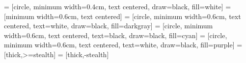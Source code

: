\usepackage{amsmath}
\usepackage{upgreek}

\usepackage{pgfpages}
\usepackage{csquotes}
\usepackage{placeins}
\usepackage[onehalfspacing]{setspace}
\usepackage{mathpartir}

\usepackage[labelformat=empty]{caption}

\usepackage{xcolor}

\RequirePackage{tikz}
\usetikzlibrary{calc}
\usetikzlibrary{arrows,shapes,positioning}

\usetikzlibrary{positioning}
 = [circle, minimum width=0.4cm, text centered, draw=black, fill=white]
 = [minimum width=0.6cm, text centered]
 = [circle, minimum width=0.6cm, text centered, text=white, draw=black, fill=darkgray]
 = [circle, minimum width=0.6cm, text centered, text=black, draw=black, fill=cyan]
 = [circle, minimum width=0.6cm, text centered, text=white, draw=black, fill=purple]
 = [thick,>=stealth]
 = [thick,-stealth]


\usepackage{wasysym}

\usepackage[vlined, linesnumbered, ruled]{algorithm2e}
\IncMargin{1.5em}


\usepackage{appendixnumberbeamer}

\setcounter{totalsections}{0}

\let\oldsection\section
\renewcommand{\section}[2][]{%
    \stepcounter{totalsections}%
    \oldsection[#1]{#2}%
}


\usepackage{booktabs}
\usepackage{multicol}
\usepackage{multirow}
\usepackage{colortbl}

\usepackage[short,nodayofweek]{datetime}

\newcommand{\myvec}[1]{\ensuremath{\begin{pmatrix}#1\end{pmatrix}}}
\def\spvec#1{\left(\vcenter{\halign{\hfil$##$\hfil\cr \spvecA#1;;}}\right)}
\def\spvecA#1;{\if;#1;\else #1\cr \expandafter \spvecA \fi}

